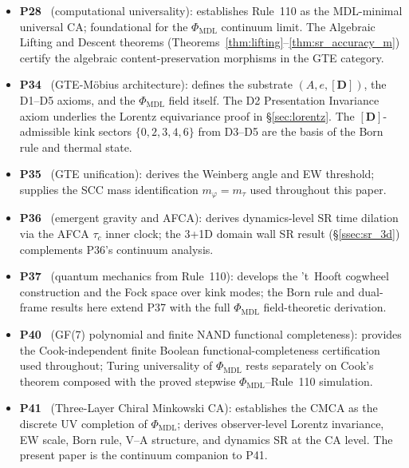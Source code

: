 \documentclass[11pt]{article}
\theoremstyle{remark}
\newcommand{\PHIMDL}{\Phi_{\mathrm{MDL}}}
\newcommand{\mtau}{m_\tau}
\begin{document}
\begin{itemize}[noitemsep]
  \item \textbf{P28}~\cite{SpivackCompUniversality} (computational
    universality): establishes Rule~110 as the MDL-minimal universal CA;
    foundational for the $\PHIMDL$ continuum limit.  The Algebraic
    Lifting and Descent theorems
    (Theorems~\ref{thm:lifting}--\ref{thm:sr_accuracy_m}) certify the
    algebraic content-preservation morphisms in the GTE category.

  \item \textbf{P34}~\cite{SpivackGTEMobius} (GTE-M\"obius architecture):
    defines the substrate $(A,e,[\mathbf{D}])$, the D1--D5 axioms, and the
    $\PHIMDL$ field itself.  The D2 Presentation Invariance axiom underlies
    the Lorentz equivariance proof in \S\ref{sec:lorentz}.  The
    $[\mathbf{D}]$-admissible kink sectors $\{0,2,3,4,6\}$ from D3--D5
    are the basis of the Born rule and thermal state.

  \item \textbf{P35}~\cite{SpivackGTEUnification} (GTE unification):
    derives the Weinberg angle and EW threshold; supplies the SCC mass
    identification $m_\varphi=\mtau$ used throughout this paper.

  \item \textbf{P36}~\cite{SpivackEmergentGravity} (emergent gravity and
    AFCA): derives dynamics-level SR time dilation via the AFCA $\tau_c$
    inner clock; the 3+1D domain wall SR result (\S\ref{ssec:sr_3d})
    complements P36's continuum analysis.

  \item \textbf{P37}~\cite{SpivackQMFromR110} (quantum mechanics from
    Rule~110): develops the 't~Hooft cogwheel construction and the Fock
    space over kink modes; the Born rule and dual-frame results here
    extend P37 with the full $\PHIMDL$ field-theoretic derivation.

  \item \textbf{P40}~\cite{SpivackGF7Universality} (GF(7) polynomial and
    finite NAND functional completeness): provides the Cook-independent
    finite Boolean functional-completeness certification used throughout;
    Turing universality of $\PHIMDL$ rests separately on Cook's theorem
    composed with the proved stepwise $\PHIMDL$--Rule~110 simulation.

  \item \textbf{P41}~\cite{SpivackCMCA} (Three-Layer Chiral Minkowski CA):
    establishes the CMCA as the discrete UV completion of $\PHIMDL$;
    derives observer-level Lorentz invariance, EW scale, Born rule,
    V--A structure, and dynamics SR at the CA level.  The present paper
    is the continuum companion to P41.


\end{itemize}
\end{document}
